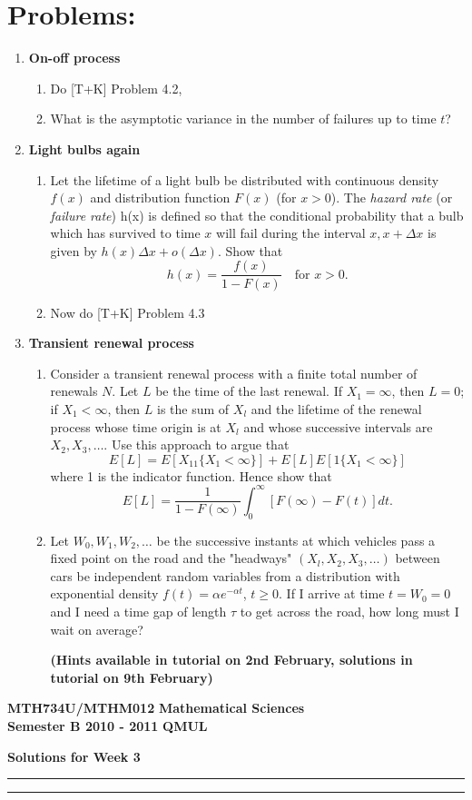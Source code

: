 \documentclass[11pt,a4paper]{article}
\begin{document}
  \section*{Problems:}
  \begin{enumerate}
    \item \textbf{On-off process}
    \begin{enumerate}
      \item Do [T+K] Problem 4.2,
      \item What is the asymptotic variance in the number of failures up to time $t$?
    \end{enumerate}
    \item \textbf{Light bulbs again}
    \begin{enumerate}
      \item Let the lifetime of a light bulb be distributed with continuous density $f(x)$ and distribution function $F(x)$ (for $x > 0$). The \textit{hazard rate} (or \textit{failure rate}) h(x) is defined so that the conditional probability that a bulb which has survived to time $x$ will fail during the interval $x, x + \Delta x$ is given by $h(x)\Delta x + o(\Delta x)$. Show that
      $$
      h(x) = \frac{f(x)}{1 - F(x)}\quad \text{for $x > 0$}.
      $$
      \item Now do [T+K] Problem 4.3
    \end{enumerate}
    \item \textbf{Transient renewal process}
    \begin{enumerate}
      \item Consider a transient renewal process with a finite total number of renewals $N$. Let $L$ be the time of the last renewal. If $X_1 = \infty$, then $L = 0$; if $X_1 < \infty$, then $L$ is the sum of $X_l$ and the lifetime of the renewal process whose time origin is at $X_l$ and whose successive intervals are $X_2, X_3, \ldots$. Use this approach to argue that
      $$
      E[L] = E[X_11\{X_1 < \infty\}] + E[L]E[1\{X_1 < \infty\}]
      $$
      where 1 is the indicator function. Hence show that
      $$
      E[L] = \frac{1}{1 - F(\infty)}\int_0^\infty[F(\infty) - F(t)]dt.
      $$
      \item Let $W_0, W_1, W_2,\ldots$ be the successive instants at which vehicles pass a fixed point on the road and the "headways" $(X_l, X_2, X_3, \ldots)$ between cars be independent random variables from a distribution with exponential density $f(t) = \alpha e^{-\alpha t}$, $t \geq 0$. If I arrive at time $t = W_0 = 0$ and I need a time gap of length $\tau$ to get across the road, how long must I wait on average?\par 
      \textbf{(Hints available in tutorial on 2nd February, solutions in tutorial on 9th February)}
    \end{enumerate}
  \end{enumerate}
  \newpage
  \textbf{MTH734U/MTHM012} \hfill \textbf{Mathematical Sciences}\\
  \textbf{Semester B 2010 - 2011} \hfill \textbf{QMUL}
  \begin{center}
    \textbf{\huge Solutions for Week 3}
  \end{center}
  \hrule \vspace{2mm} \hrule
\end{document}
